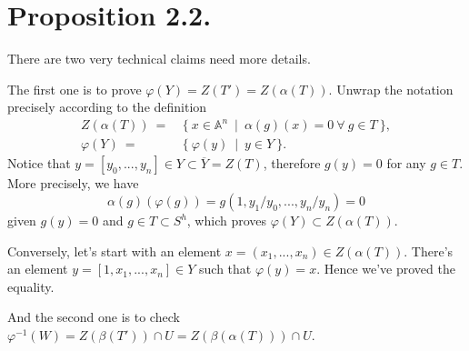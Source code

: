 \section{Proposition 2.2.}

There are two very technical claims need more details. 

The first one is to prove $\varphi(Y)=Z(T')=Z(\alpha (T)).$
Unwrap the notation precisely according to the definition \begin{align*}
    Z(\alpha (T)) ~=&~ \{~ x\in \mathbb A^n ~\mid~ \alpha(g)(x)=0 ~\forall~ g\in T ~\},\\
    \varphi(Y) ~=&~ \{~ \varphi(y) ~\mid~ y\in Y ~\}.
\end{align*}
Notice that $y=[y_0,...,y_n]\in Y\subset \overline{Y}=Z(T)$, therefore $g(y)=0$ for any $g\in T$.
More precisely, we have 
\[\alpha(g)(\varphi(g))=g(1,y_1/y_0,...,y_n/y_n)=0\] given $g(y)=0$ and $g\in T\subset S^h$, which proves $\varphi(Y)\subset Z(\alpha (T))$.

Conversely, let's start with an element $x=(x_1,...,x_n)\in Z(\alpha (T))$. There's an element $y=[1,x_1,...,x_n]\in Y$ such that $\varphi(y)=x$. Hence we've proved the equality.

And the second one is to check $\varphi^{-1}(W)=Z(\beta(T'))\cap U=Z(\beta(\alpha(T)))\cap U$.